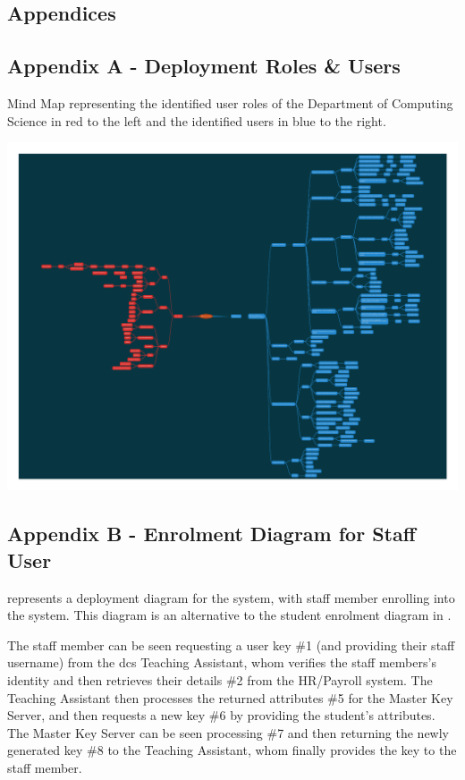 \begin{appendices}

\chapter{Appendices}
\label{ch:appendices}

\section{Appendix A - Deployment Roles \& Users}
\label{appendix:roles_users}

Mind Map representing the identified user roles of the Department of Computing Science in red to the left and the identified users in blue to the right.

\includegraphics[width=\linewidth]{appendices/mind_maps/ABE_Users_slides_Oct26.pdf}

\section{Appendix B - Enrolment Diagram for Staff User}
\label{appendix:enrolment_diagram}

 represents a deployment diagram for the \theResServer system, with staff member enrolling into the system. This diagram is an alternative to the student enrolment diagram in .

The staff member can be seen requesting a user key \#1 (and providing their staff username) from the \acrshort{dcs} Teaching Assistant, whom verifies the staff members's identity and then retrieves their details \#2 from the HR/Payroll system. The Teaching Assistant then processes the returned attributes \#5 for the Master Key Server, and then requests a new key \#6 by providing the student's attributes. The Master Key Server can be seen processing \#7 and then returning the newly generated key \#8 to the Teaching Assistant, whom finally provides the key to the staff member.


\end{appendices}
